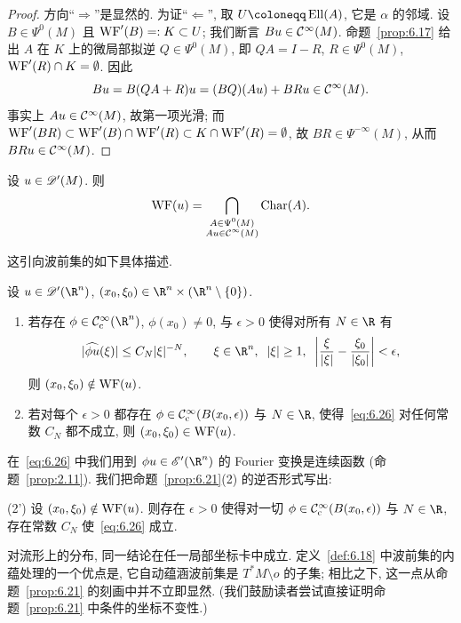 \begin{proof}
方向``$\Longrightarrow$''是显然的. 为证``$\Longleftarrow$'', 取 $U \defeq \Ell(A)$, 它是 $\alpha$ 的邻域. 设 $B \in \Psi^0(M)$ 且 $\operatorname{WF}'(B) =: K \subset U$; 我们断言 $B u \in \mathcal{C}^\infty(M)$. 命题~\ref{prop:6.17} 给出 $A$ 在 $K$ 上的微局部拟逆 $Q \in \Psi^0(M)$, 即 $Q A = I - R$, $R \in \Psi^0(M)$, $\operatorname{WF}'(R) \cap K = \emptyset$. 因此
\begin{equation}\label{eq:6.24}
    B u = B(Q A + R) u = (B Q)(A u) + B R u \in \mathcal{C}^\infty(M).
\end{equation}
事实上 $A u \in \mathcal{C}^\infty(M)$, 故第一项光滑; 而 $\operatorname{WF}'(B R) \subset \operatorname{WF}'(B) \cap \operatorname{WF}'(R) \subset K \cap \operatorname{WF}'(R) = \emptyset$, 故 $B R \in \Psi^{-\infty}(M)$, 从而 $B R u \in \mathcal{C}^\infty(M)$.
\end{proof}

\begin{corollary}\label{cor:6.20}
设 $u \in \mathscr{D}'(M)$. 则
\begin{equation}\label{eq:6.25}
    \operatorname{WF}(u) = \bigcap_{\substack{A \in \Psi^0(M) \\ A u \in \mathcal{C}^\infty(M)}} \operatorname{Char}(A).
\end{equation}
\end{corollary}

这引向波前集的如下具体描述.

\begin{proposition}\label{prop:6.21}
设 $u \in \Distr(\R^n)$, $(x_0, \xi_0) \in \R^n \times (\R^n \setminus \{0\})$.
\begin{enumerate}
    \item 若存在 $\phi \in \SmoothComp(\R^n)$, $\phi(x_0) \neq 0$, 与 $\epsilon > 0$ 使得对所有 $N \in \R$ 有
    \begin{equation}\label{eq:6.26}
        |\widehat{\phi u}(\xi)| \le C_N |\xi|^{-N}, \qquad \xi \in \R^n, \;\; |\xi| \ge 1, \;\; \left| \frac{\xi}{|\xi|} - \frac{\xi_0}{|\xi_0|} \right| < \epsilon,
    \end{equation}
    则 $(x_0, \xi_0) \notin \operatorname{WF}(u)$.
    \item 若对每个 $\epsilon > 0$ 都存在 $\phi \in \mathcal{C}_{\mathrm{c}}^\infty(B(x_0, \epsilon))$ 与 $N \in \R$, 使得~\eqref{eq:6.26} 对任何常数 $C_N$ 都不成立, 则 $(x_0, \xi_0) \in \operatorname{WF}(u)$.
\end{enumerate}
在~\eqref{eq:6.26} 中我们用到 $\phi u \in \mathscr{E}'(\R^n)$ 的 Fourier 变换是连续函数 (命题~\ref{prop:2.11}). 我们把命题~\ref{prop:6.21}(2) 的逆否形式写出:

(2') 设 $(x_0, \xi_0) \notin \operatorname{WF}(u)$. 则存在 $\epsilon > 0$ 使得对一切 $\phi \in \mathcal{C}_{\mathrm{c}}^\infty(B(x_0, \epsilon))$ 与 $N \in \R$, 存在常数 $C_N$ 使~\eqref{eq:6.26} 成立.

对流形上的分布, 同一结论在任一局部坐标卡中成立. 定义~\ref{def:6.18} 中波前集的内蕴处理的一个优点是, 它自动蕴涵波前集是 $T^* M \setminus o$ 的子集; 相比之下, 这一点从命题~\ref{prop:6.21} 的刻画中并不立即显然. (我们鼓励读者尝试直接证明命题~\ref{prop:6.21} 中条件的坐标不变性.)
\end{proposition}

